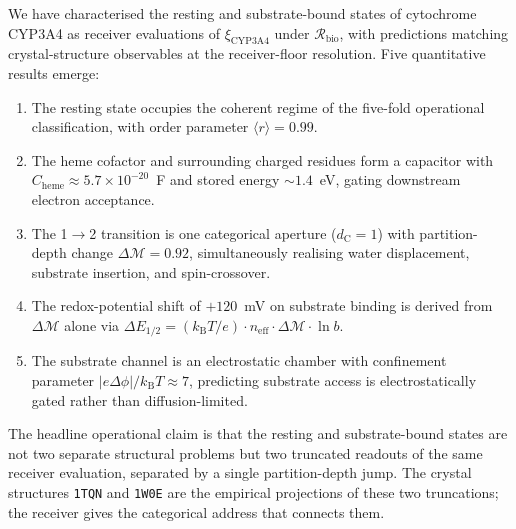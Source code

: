 \documentclass[11pt,twocolumn,a4paper]{article}
\theoremstyle{definition}
\theoremstyle{remark}
\newcommand{\kB}{k_{\mathrm{B}}}
\newcommand{\Recv}{\mathcal{R}}
\newcommand{\Sexp}{\xi}
\newcommand{\depth}{\mathcal{M}}
\newcommand{\dC}{d_{\mathrm{C}}}
\newcommand{\orderpar}{\langle r \rangle}
\begin{document}
We have characterised the resting and substrate-bound states of cytochrome CYP3A4 as receiver evaluations of $\Sexp_{\mathrm{CYP3A4}}$ under $\Recv_{\mathrm{bio}}$, with predictions matching crystal-structure observables at the receiver-floor resolution. Five quantitative results emerge:
\begin{enumerate}[nosep, leftmargin=*]
\item The resting state occupies the coherent regime of the five-fold operational classification, with order parameter $\orderpar = 0.99$.
\item The heme cofactor and surrounding charged residues form a capacitor with $C_{\mathrm{heme}} \approx 5.7 \times 10^{-20}$~F and stored energy $\sim 1.4$~eV, gating downstream electron acceptance.
\item The 1$\to$2 transition is one categorical aperture ($\dC = 1$) with partition-depth change $\Delta\depth = 0.92$, simultaneously realising water displacement, substrate insertion, and spin-crossover.
\item The redox-potential shift of $+120$~mV on substrate binding is derived from $\Delta\depth$ alone via $\Delta E_{1/2} = (\kB T/e) \cdot n_{\mathrm{eff}} \cdot \Delta\depth \cdot \ln b$.
\item The substrate channel is an electrostatic chamber with confinement parameter $|e\Delta\phi|/\kB T \approx 7$, predicting substrate access is electrostatically gated rather than diffusion-limited.
\end{enumerate}

The headline operational claim is that the resting and substrate-bound states are not two separate structural problems but two truncated readouts of the same receiver evaluation, separated by a single partition-depth jump. The crystal structures \texttt{1TQN} and \texttt{1W0E} are the empirical projections of these two truncations; the receiver gives the categorical address that connects them.



\end{document}
